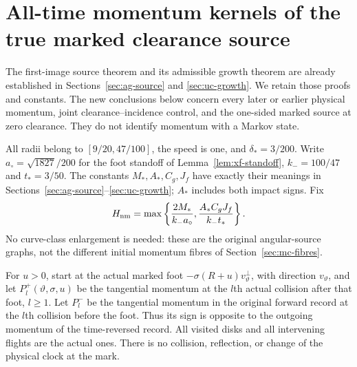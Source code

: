 \section{All-time momentum kernels of the true marked clearance source}
\label{sec:nm-kernel}

The first-image source theorem and its admissible growth theorem are
already established in Sections~\ref{sec:ag-source} and
\ref{sec:uc-growth}.  We retain those proofs and constants.  The new
conclusions below concern every later or earlier physical momentum,
joint clearance--incidence control, and the one-sided marked source at
zero clearance.  They do not identify momentum with a Markov state.

All radii belong to $[9/20,47/100]$, the speed is one, and
$\delta_*=3/200$.  Write $a_\circ=\sqrt{1827}/200$ for the
foot standoff of Lemma~\ref{lem:xf-standoff}, $k_-=100/47$ and
$t_*=3/50$.  The constants $M_*,A_*,C_g,J_f$ have exactly their
meanings in Sections~\ref{sec:ag-source}--\ref{sec:uc-growth};
$A_*$ includes both impact signs.  Fix
\begin{equation}\label{eq:nm-H}
 H_{\rm nm}=\max\left\{\frac{2M_*}{k_-a_\circ},
                    \frac{A_*C_gJ_f}{k_-t_*}\right\}.
\end{equation}
No curve-class enlargement is needed: these are the original
angular-source graphs, not the different initial momentum fibres of
Section~\ref{sec:mc-fibres}.

For $u>0$, start at the actual marked foot
$-\sigma(R+u)v_\vartheta^\perp$, with direction $v_\vartheta$,
and let $P_l^+(\vartheta,\sigma,u)$ be the tangential momentum at
the $l$th actual collision after that foot, $l\ge1$.  Let $P_l^-$
be the tangential momentum in the original forward record at the
$l$th collision before the foot.  Thus its sign is opposite to the
outgoing momentum of the time-reversed record.  All visited disks
and all intervening flights are the actual ones.  There is no
collision, reflection, or change of the physical clock at the mark.

